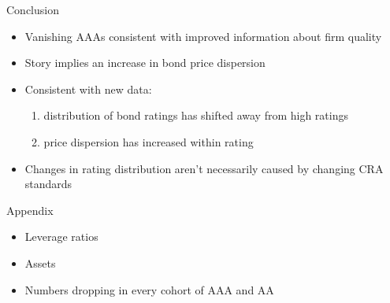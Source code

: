 \documentclass{beamer}
\begin{document}
\begin{frame}{Conclusion}
\begin{itemize}
	\item Vanishing AAAs consistent with improved information about firm quality
	\item Story implies an increase in bond price dispersion
	\item Consistent with new data:
	\begin{enumerate}
		\item distribution of bond ratings has shifted away from high ratings
		\item price dispersion has increased within rating
	\end{enumerate}
	\item Changes in rating distribution aren't necessarily caused by changing CRA standards
\end{itemize}
\end{frame}

\begin{frame}[label=app]{Appendix}
\addtocounter{framenumber}{-1}
\begin{itemize}
\item Leverage ratios\\
\hyperlink{lev_rating}{} \hyperlink{lev_cohort}{}
\item Assets\\
\hyperlink{assets}{}
\item Numbers dropping in every cohort of AAA and AA\\
\hyperlink{cohorts}{}
\end{itemize}
\hyperlink{robust}{}
\end{frame}

\end{document}
